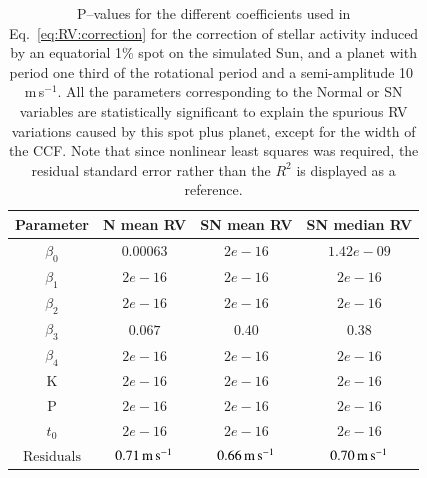 \documentclass{aa}
\def\ms{\hbox{\,m\,s$^{-1}$}}         %
\begin{document}
\begin{table}
\begin{center}
\caption{P--values for the different coefficients used in Eq.~\ref{eq:RV:correction} for the correction of stellar activity induced by an equatorial 1\% spot on the simulated Sun, and a planet with period one third of the rotational period and a semi-amplitude 10\,\ms. All the parameters corresponding to the Normal or SN variables are statistically significant to explain the spurious RV variations caused by this spot plus planet, except for the width of the CCF. Note that since nonlinear least squares was required, the residual standard error rather than the $R^2$ is displayed as a reference.}
\label{table:spotplanet.test}
\begin{tabular}{|c|c|c|c|}
\hline
Parameter          & N mean RV         &   SN mean RV &   SN median RV \\
\hline
$\beta_{0}$            &    $0.00063$    & $2e-16$  & $1.42e-09$ \\
\hline
$\beta_{1}$            &    $2e-16$    & $2e-16$  & $2e-16$ \\
\hline
$\beta_{2}$            &     $2e-16$   & $2e-16$ & $2e-16$\\
\hline
$\beta_{3}$            &     $0.067$   &  $0.40$  & $0.38$\\
\hline
$\beta_{4}$            &     $2e-16$   &  $2e-16$ & $2e-16$\\
\hline
K            &     $2e-16$   &  $2e-16$   & $2e-16$ \\
\hline
P            &     $2e-16$   &  $2e-16$ & $2e-16$ \\
\hline
$t_{0}$            &     $2e-16$   &  $2e-16$ & $2e-16$ \\
\hline
$\text{Residuals}$      &     $0.71 \ms$    &  $ 0.66 \ms$ & $0.70 \ms$  \\
\hline
\end{tabular}
\end{center}
\end{table}
\end{document}
